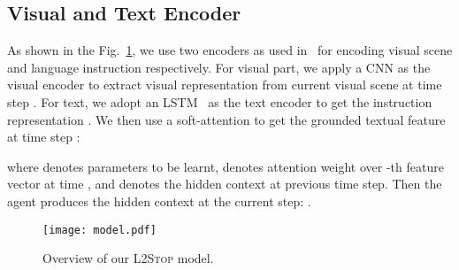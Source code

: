 \documentclass[11pt,a4paper]{article}
\begin{document}
\subsection{Visual and Text Encoder}
As shown in the Fig.~\ref{fig:figure2}, we use two encoders as used in~\citet{chen2019touchdown} for encoding visual scene and language instruction respectively. For visual part, we apply a CNN \citep{krizhevsky2012imagenet} as the visual encoder to extract visual representation  from current visual scene at time step . For text, we adopt an LSTM~\citep{hochreiter1997long} as the text encoder to get the instruction representation . We then use a soft-attention \citep{vaswani2017attention} to get the grounded textual feature  at time step :

where  denotes parameters to be learnt,  denotes attention weight over -th feature vector at time , and  denotes the hidden context at previous time step.
Then the agent produces the hidden context at the current step: .


\begin{figure}
\begin{center}
\texttt{[image: model.pdf]}
\end{center}
   \caption{Overview of our \textsc{L2Stop} model.}
\label{fig:figure2}
\end{figure}


\begin{table*}[t]
\small
  \centering
  \caption{Experimental results on development and test sets.}
  \label{table1}
\end{table*}
\end{document}
